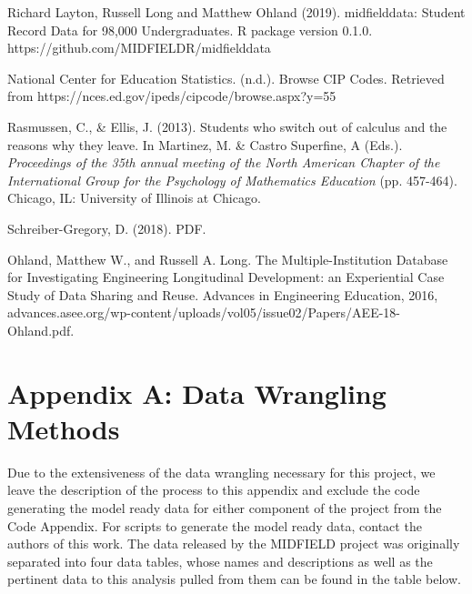 \documentclass[]{article}
\begin{document}
\begin{thebibliography}{9}
Richard Layton, Russell Long and Matthew Ohland
  (2019). midfielddata: Student Record Data for 98,000
  Undergraduates. R package version 0.1.0.
  https://github.com/MIDFIELDR/midfielddata

National Center for Education Statistics. (n.d.).  Browse CIP Codes. Retrieved from https://nces.ed.gov/ipeds/cipcode/browse.aspx?y=55

Rasmussen, C., \& Ellis, J. (2013). Students who switch out of calculus and the reasons why they leave. In Martinez, M. \& Castro Superfine, A (Eds.). \textit{Proceedings of the 35th annual meeting of the North American Chapter of the International Group for the
Psychology of Mathematics Education} (pp. 457-464). Chicago, IL: University of Illinois at Chicago.

Schreiber-Gregory, D. (2018). PDF.

Ohland, Matthew W., and Russell A. Long. The Multiple-Institution Database for Investigating Engineering Longitudinal Development: an Experiential Case Study of Data Sharing and Reuse. Advances in Engineering Education, 2016, advances.asee.org/wp-content/uploads/vol05/issue02/Papers/AEE-18-Ohland.pdf.

\end{thebibliography}

\newpage

\section{Appendix A: Data Wrangling
Methods}\label{appendix-a-data-wrangling-methods}

Due to the extensiveness of the data wrangling necessary for this
project, we leave the description of the process to this appendix and
exclude the code generating the model ready data for either component of
the project from the Code Appendix. For scripts to generate the model
ready data, contact the authors of this work. The data released by the
MIDFIELD project was originally separated into four data tables, whose
names and descriptions as well as the pertinent data to this analysis
pulled from them can be found in the table below.
\end{document}
